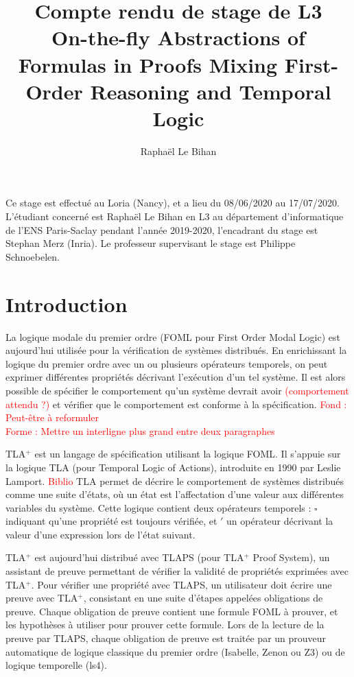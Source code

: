 \documentclass[12pt]{article}
\title{%
  Compte rendu de stage de L3\\
  \vspace{8pt}
  \large On-the-fly Abstractions of Formulas in Proofs
Mixing First-Order Reasoning and Temporal Logic}
\author{Raphaël Le Bihan}
\newcommand{\raph}[1]{\textcolor{red}{#1}}
\begin{document}
\fancyfoot[CEO]{\thepage}

\maketitle

Ce stage est effectué au Loria (Nancy), et a lieu du 08/06/2020 au 17/07/2020.
L'étudiant concerné est Raphaël Le Bihan en L3 au département d'informatique de l'ENS Paris-Saclay pendant l'année 2019-2020, l'encadrant du stage est Stephan Merz (Inria).
Le professeur supervisant le stage est Philippe Schnoebelen.


\clearpage

\section{Introduction}

La logique modale du premier ordre (FOML pour First Order Modal Logic) est aujourd'hui utilisée pour la vérification de systèmes distribués.
En enrichissant la logique du premier ordre avec un ou plusieurs opérateurs temporels, on peut exprimer différentes propriétés décrivant l'exécution d'un tel système.
Il est alors possible de spécifier le comportement qu'un système devrait avoir \raph{(comportement attendu ?)} et vérifier que le comportement est conforme à la spécification.
\raph{Fond : Peut-être à reformuler}\\
\raph{Forme : Mettre un interligne plus grand entre deux paragraphes}

TLA$^+$ est un langage de spécification utilisant la logique FOML.
Il s'appuie sur la logique TLA (pour Temporal Logic of Actions), introduite en 1990 par Leslie Lamport. \raph{Biblio}
TLA permet de décrire le comportement de systèmes distribués comme une suite d'états, où un état est l'affectation d'une valeur aux différentes variables du système.
Cette logique contient deux opérateurs temporels : $\square$ indiquant qu'une propriété est toujours vérifiée, et $'$ un opérateur décrivant la valeur d'une expression lors de l'état suivant.

TLA$^+$ est aujourd'hui distribué avec TLAPS (pour TLA$^+$ Proof System), un assistant de preuve permettant de vérifier la validité de propriétés exprimées avec TLA$^+$.
Pour vérifier une propriété avec TLAPS, un utilisateur doit écrire une preuve avec TLA$^+$, consistant en une suite d'étapes appelées obligations de preuve.
Chaque obligation de preuve contient une formule FOML à prouver, et les hypothèses à utiliser pour prouver cette formule.
Lors de la lecture de la preuve par TLAPS, chaque obligation de preuve est traitée par un prouveur automatique de logique classique du premier ordre (Isabelle, Zenon ou Z3) ou de logique temporelle (ls4).
\end{document}
